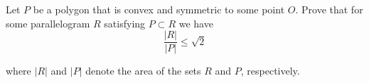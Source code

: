 Let $P$ be a polygon that is convex and symmetric to some point $O$. Prove that for some parallelogram $R$ satisfying $P\subset R$ we have \[\frac{|R|}{|P|}\leq \sqrt 2\]

where $|R|$ and $|P|$ denote the area of the sets $R$ and $P$,  respectively.